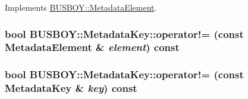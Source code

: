 Implements \hyperlink{classBUSBOY_1_1MetadataElement_a048a64f1d70affc5bfdd78a9958c5fb9}{BUSBOY::MetadataElement}.\hypertarget{classBUSBOY_1_1MetadataKey_afc2a154f70d75e71fd315ab53418fe23}{
\subsubsection[{operator!=}]{\setlength{\rightskip}{0pt plus 5cm}bool BUSBOY::MetadataKey::operator!= (const {\bf MetadataElement} \& {\em element}) const}}
\label{classBUSBOY_1_1MetadataKey_afc2a154f70d75e71fd315ab53418fe23}
\hypertarget{classBUSBOY_1_1MetadataKey_aa87f34cefe429a511ee280c29a9de761}{
\subsubsection[{operator!=}]{\setlength{\rightskip}{0pt plus 5cm}bool BUSBOY::MetadataKey::operator!= (const {\bf MetadataKey} \& {\em key}) const}}
\label{classBUSBOY_1_1MetadataKey_aa87f34cefe429a511ee280c29a9de761}


